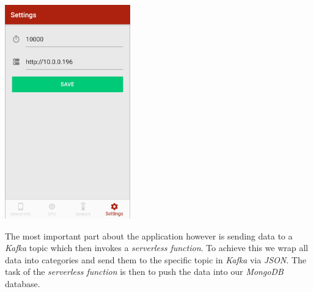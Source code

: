 \documentclass{article}
\begin{document}
\begin{itemize}
    \begin{center}
      \includegraphics[height=25em]{mobile-settings}
    \end{center}
  \end{itemize}

  The most important part about the application however is sending data to a \textit{Kafka} topic which then invokes a \textit{serverless function}. To achieve this we wrap all data into categories and send them to the specific topic in \textit{Kafka} via \textit{JSON}. The task of the \textit{serverless function} is then to push the data into our \textit{MongoDB} database.
  
\end{document}
